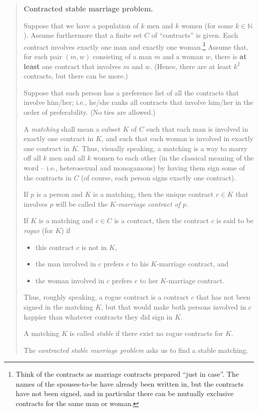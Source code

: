 \documentclass[numbers=enddot,12pt,final,onecolumn,notitlepage]{scrartcl}%
\theoremstyle{definition}
\newenvironment{statement}{\begin{quote}}{\end{quote}}
\newcommand{\NN}{\mathbb{N}}
\newcommand{\tup}[1]{\left( #1 \right)}
\begin{document}
\begin{statement}
\textbf{Contracted stable marriage problem.}

Suppose that we have a population of $k$ men and $k$ women
(for some $k \in \NN$).
Assume furthermore that a finite set $C$ of
``contracts'' is given.
Each contract involves exactly one man and exactly
one woman.\footnote{Think of the contracts as marriage
contracts prepared ``just in case''. The names of the
spouses-to-be have already been written in, but the
contracts have not been signed, and in particular there
can be mutually exclusive contracts for the same man or
woman.}
Assume that, for each pair $\tup{m, w}$ consisting of a man $m$
and a woman $w$, there is \textbf{at least} one contract
that involves $m$ and $w$.
(Hence, there are at least $k^2$ contracts, but
there can be more.)

Suppose that each person has a preference list of all the
contracts that involve him/her; i.e., he/she ranks
all contracts that involve him/her in the order of
preferability.
(No ties are allowed.)

A \textit{matching} shall mean a subset $K$ of $C$ such
that each man is involved in exactly one contract in $K$,
and such that each woman is involved in exactly one
contract in $K$.
Thus, visually speaking, a matching is a way to marry off
all $k$ men and all $k$ women to each other (in the
classical meaning of the word -- i.e., heterosexual and
monogamous)
by having them sign some of the contracts in $C$
(of course, each person signs exactly one contract).

If $p$ is a person and $K$ is a matching, then the
unique contract $c \in K$ that involves $p$ will be called
the \textit{$K$-marriage contract of $p$}.

If $K$ is a matching and $c \in C$ is a contract, then
the contract $c$ is said to be \textit{rogue} (for $K$) if
\begin{itemize}
 \item this contract $c$ is not in $K$,
 \item the man involved in $c$ prefers $c$ to his
       $K$-marriage contract, and
 \item the woman involved in $c$ prefers $c$ to her
       $K$-marriage contract.
\end{itemize}
Thus, roughly speaking, a rogue contract is a contract
$c$ that has not been signed in the matching $K$, but that
would make both persons involved in $c$ happier than
whatever contracts they did sign in $K$.

A matching $K$ is called \textit{stable} if there exist
no rogue contracts for $K$.

The \textit{contracted stable marriage problem} asks us
to find a stable matching.
\end{statement}
\end{document}
